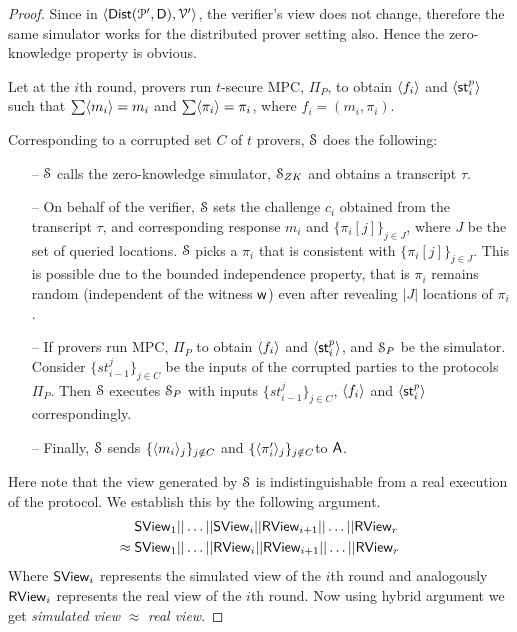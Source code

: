 \begin{proof}
	
	Since in $\langle \mathsf{Dist}(\mathcal{P}', \mathsf{D}), \mathcal{V}' \rangle$, the verifier's view does not change, therefore the same simulator works for the distributed prover setting also. Hence the zero-knowledge property is obvious.
	
	Let at the $i$th round, provers run $t$-secure MPC, $\Pi_P$, to obtain $\langle f_i \rangle$ and $\langle \mathsf{st}^p_i \rangle$ such that $\sum \langle m_i \rangle = m_i$ and $\sum \langle \pi_i \rangle = \pi_i$, where $f_i = (m_i, \pi_i)$.
	
	Corresponding to a corrupted set $C$ of $t$ provers, $\mathcal{S}$ does the following:
	\begin{itemize}
		\item[--] $\mathcal{S}$ calls the zero-knowledge simulator, $\mathcal{S}_{ZK}$ and obtains a transcript $\tau$.
		\item[--] On behalf of the verifier, $\mathcal{S}$ sets the challenge $c_i$ obtained from the transcript $\tau$, and corresponding response $m_i$ and $\{\pi_i[j]\}_{j\in J}$, where $J$ be the set of queried locations. $\mathcal{S}$ picks a $\pi_i$ that is consistent with $\{\pi_i[j]\}_{j\in J}$. This is possible due to the bounded independence property, that is $\pi_i$ remains random (independent of the witness $\mathsf{w}$) even after revealing $|J|$ locations of $\pi_i$.
		\item[--] If provers run MPC, $\Pi_{P}$ to obtain $\langle f_i \rangle$ and $\langle \mathsf{st}^p_i \rangle$, and $\mathcal{S}_{P}$ be the simulator. Consider $\{st^j_{i-1}\}_{j\in C}$ be the inputs of the corrupted parties to the protocols $\Pi_{P}$. Then $\mathcal{S}$ executes $\mathcal{S}_{P}$ with inputs $\{st^j_{i-1}\}_{j\in C}$, $\langle f_i \rangle$ and $\langle \mathsf{st}^p_i \rangle$ correspondingly.
		\item[--] Finally, $\mathcal{S}$ sends $\{\langle m_i \rangle_j\}_{j\notin C}$ and $\{\langle \pi'_i \rangle_j\}_{j\notin C}$to $\mathsf{A}$.
	\end{itemize}
	Here note that the view generated by $\mathcal{S}$ is indistinguishable from a real execution of the protocol. We establish this by the following argument.
	\begin{align*}
	& \mathsf{S View}_1 || \ldots ||\mathsf{S View}_i || \mathsf{R View}_{i+1}|| \ldots || \mathsf{R View}_r \\
	\approx\; 
	& \mathsf{S View}_1 || \ldots ||\mathsf{R View}_i || \mathsf{R View}_{i+1}|| \ldots || \mathsf{R View}_r 
	\end{align*}
	Where $\mathsf{S View}_i$ represents the simulated view of the $i$th round and analogously $\mathsf{R View}_i$ represents the real view of the $i$th round.
	Now using hybrid argument we get \textit{simulated view} $\approx$ \textit{real view}.
	

\end{proof}
